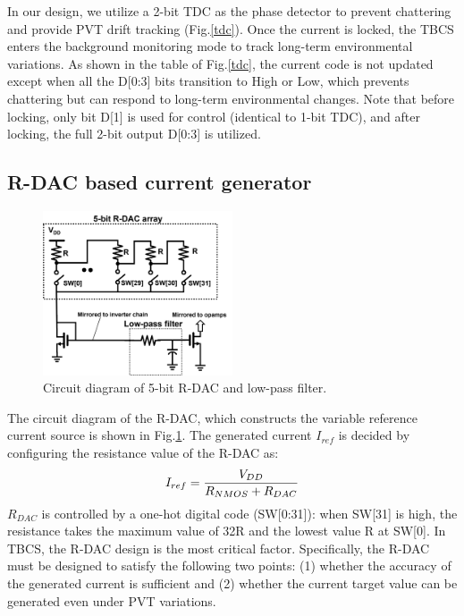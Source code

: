 \documentclass[paper]{ieice}
\begin{document}
In our design, we utilize a 2-bit TDC as the phase detector to prevent chattering and provide PVT drift tracking (Fig.\ref{tdc}).
Once the current is locked, the TBCS enters the background monitoring mode to track long-term environmental variations.  As shown in the table of Fig.\ref{tdc}, the current code is not updated except when all the D[0:3] bits transition to High or Low, which prevents chattering but can respond to long-term environmental changes. Note that before locking, only bit D[1] is used for control (identical to 1-bit TDC), and after locking, the full 2-bit output D[0:3] is utilized.

\subsection{R-DAC based current generator}
\begin{figure}[!t]
\centering
 \includegraphics[width=0.5\textwidth]{figs/rdac.png}
  \caption{Circuit diagram of 5-bit R-DAC and low-pass filter.}
\label{rdac_sche}
\end{figure}

\qquad The circuit diagram of the R-DAC, which constructs the variable reference current source is shown in Fig.\ref{rdac_sche}. The generated current $I_{ref}$ is decided by configuring the resistance value of the R-DAC as:
\begin{eqnarray}
    \centering
     I_{ref} = \frac{V_{DD}}{R_{NMOS}+R_{DAC}}
    \label{iref_eq}
\end{eqnarray}
$R_{DAC}$ is controlled by a one-hot digital code (SW[0:31]): when SW[31] is high, the resistance takes the maximum value of 32R and the lowest value R at SW[0]. In TBCS, the R-DAC design is the most critical factor. Specifically, the R-DAC must be designed to satisfy the following two points: (1) whether the accuracy of the generated current is sufficient and (2) whether the current target value can be generated even under PVT variations.
\end{document}
